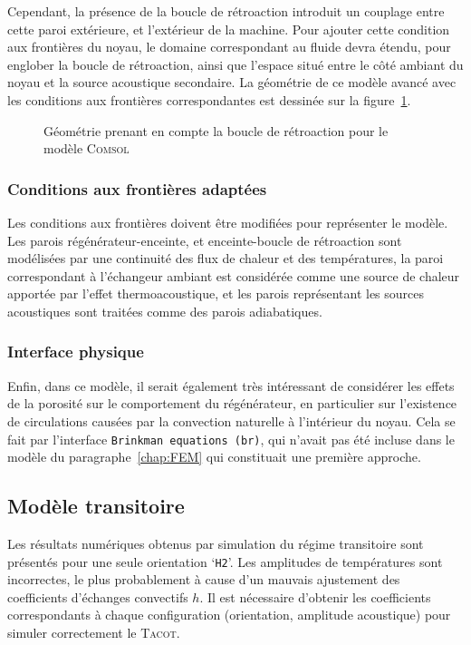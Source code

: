 Cependant, la présence de la boucle de rétroaction introduit un couplage entre cette paroi extérieure, et l'extérieur de la machine. Pour ajouter cette condition aux frontières du noyau, le domaine correspondant au fluide devra étendu, pour englober la boucle de rétroaction, ainsi que l'espace situé entre le côté ambiant du noyau et la source acoustique secondaire. La géométrie de ce modèle avancé avec les conditions aux frontières correspondantes est dessinée sur la figure~\ref{fig:Geometrie_FeedbackLoop}.

\begin{figure}[!ht]
	\centering
	
	\caption{Géométrie prenant en compte la boucle de rétroaction pour le modèle \textsc{Comsol}\textss\textregistered}
	\label{fig:Geometrie_FeedbackLoop}
\end{figure}

\subsubsection{Conditions aux frontières adaptées}
Les conditions aux frontières doivent être modifiées pour représenter le modèle. Les parois régénérateur-enceinte, et enceinte-boucle de rétroaction sont modélisées par une continuité des flux de chaleur et des températures, la paroi correspondant à l'échangeur ambiant est considérée comme une source de chaleur apportée par l'effet thermoacoustique, et les parois représentant les sources acoustiques sont traitées comme des parois adiabatiques.

\subsubsection{Interface physique}
Enfin, dans ce modèle, il serait également très intéressant de considérer les effets de la porosité sur le comportement du régénérateur, en particulier sur l'existence de circulations causées par la convection naturelle à l'intérieur du noyau. Cela se fait par l'interface \texttt{Brinkman equations (br)}, qui n'avait pas été incluse dans le modèle du paragraphe~\ref{chap:FEM} qui constituait une première approche.

\subsection{Modèle transitoire}
Les résultats numériques obtenus par simulation du régime transitoire sont présentés pour une seule orientation `\texttt{H2}'. Les amplitudes de températures sont incorrectes, le plus probablement à cause d'un mauvais ajustement des coefficients d'échanges convectifs $h$. Il est nécessaire d'obtenir les coefficients correspondants à chaque configuration (orientation, amplitude acoustique) pour simuler correctement le \textsc{Tacot}.



